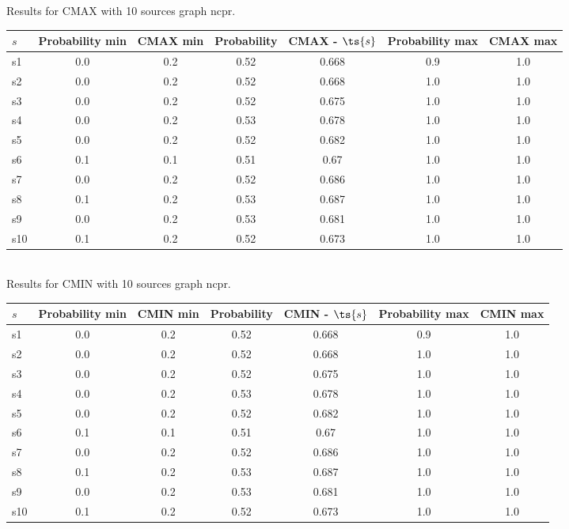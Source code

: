 \documentclass{article}
\begin{document}
\noindent Results for CMAX with 10 sources graph ncpr.

\noindent\begin{tabular}{|l|c|c|c|c|c|c|}
\hline
$s$& Probability min & CMAX min & Probability & CMAX - $\ts{s}$ & Probability max & CMAX max\\
\hline
s1 &0.0 & 0.2 & 0.52 & 0.668 & 0.9 & 1.0\\
\hline
s2 &0.0 & 0.2 & 0.52 & 0.668 & 1.0 & 1.0\\
\hline
s3 &0.0 & 0.2 & 0.52 & 0.675 & 1.0 & 1.0\\
\hline
s4 &0.0 & 0.2 & 0.53 & 0.678 & 1.0 & 1.0\\
\hline
s5 &0.0 & 0.2 & 0.52 & 0.682 & 1.0 & 1.0\\
\hline
s6 &0.1 & 0.1 & 0.51 & 0.67 & 1.0 & 1.0\\
\hline
s7 &0.0 & 0.2 & 0.52 & 0.686 & 1.0 & 1.0\\
\hline
s8 &0.1 & 0.2 & 0.53 & 0.687 & 1.0 & 1.0\\
\hline
s9 &0.0 & 0.2 & 0.53 & 0.681 & 1.0 & 1.0\\
\hline
s10 &0.1 & 0.2 & 0.52 & 0.673 & 1.0 & 1.0\\
\hline
\end{tabular}\\

\noindent Results for CMIN with 10 sources graph ncpr.

\noindent\begin{tabular}{|l|c|c|c|c|c|c|}
\hline
$s$& Probability min & CMIN min & Probability & CMIN - $\ts{s}$ & Probability max & CMIN max\\
\hline
s1 &0.0 & 0.2 & 0.52 & 0.668 & 0.9 & 1.0\\
\hline
s2 &0.0 & 0.2 & 0.52 & 0.668 & 1.0 & 1.0\\
\hline
s3 &0.0 & 0.2 & 0.52 & 0.675 & 1.0 & 1.0\\
\hline
s4 &0.0 & 0.2 & 0.53 & 0.678 & 1.0 & 1.0\\
\hline
s5 &0.0 & 0.2 & 0.52 & 0.682 & 1.0 & 1.0\\
\hline
s6 &0.1 & 0.1 & 0.51 & 0.67 & 1.0 & 1.0\\
\hline
s7 &0.0 & 0.2 & 0.52 & 0.686 & 1.0 & 1.0\\
\hline
s8 &0.1 & 0.2 & 0.53 & 0.687 & 1.0 & 1.0\\
\hline
s9 &0.0 & 0.2 & 0.53 & 0.681 & 1.0 & 1.0\\
\hline
s10 &0.1 & 0.2 & 0.52 & 0.673 & 1.0 & 1.0\\
\hline
\end{tabular}\\
\end{document}
